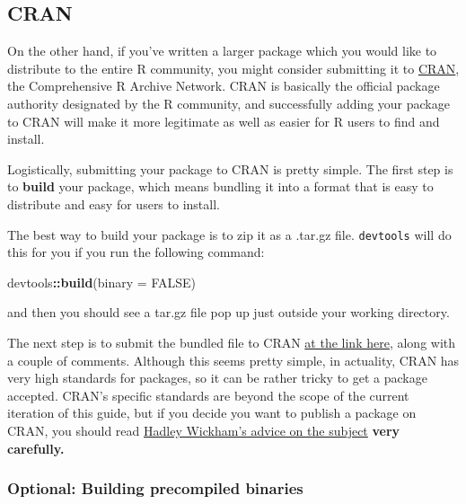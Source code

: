 \documentclass[]{book}
\newenvironment{Shaded}{\begin{snugshade}}{\end{snugshade}}
\newcommand{\KeywordTok}[1]{\textcolor[rgb]{0.13,0.29,0.53}{\textbf{#1}}}
\newcommand{\DataTypeTok}[1]{\textcolor[rgb]{0.13,0.29,0.53}{#1}}
\newcommand{\OtherTok}[1]{\textcolor[rgb]{0.56,0.35,0.01}{#1}}
\newcommand{\OperatorTok}[1]{\textcolor[rgb]{0.81,0.36,0.00}{\textbf{#1}}}
\newcommand{\NormalTok}[1]{#1}
\begin{document}
\subsection{CRAN}\label{cran}

On the other hand, if you've written a larger package which you would
like to distribute to the entire R community, you might consider
submitting it to \href{https://cran.r-project.org/}{CRAN}, the
Comprehensive R Archive Network. CRAN is basically the official package
authority designated by the R community, and successfully adding your
package to CRAN will make it more legitimate as well as easier for R
users to find and install.

Logistically, submitting your package to CRAN is pretty simple. The
first step is to \textbf{build} your package, which means bundling it
into a format that is easy to distribute and easy for users to install.

The best way to build your package is to zip it as a .tar.gz file.
\texttt{devtools} will do this for you if you run the following command:

\begin{Shaded}
\begin{Highlighting}[]
\NormalTok{devtools}\OperatorTok{::}\KeywordTok{build}\NormalTok{(}\DataTypeTok{binary =} \OtherTok{FALSE}\NormalTok{)}
\end{Highlighting}
\end{Shaded}

and then you should see a tar.gz file pop up just outside your working
directory.

The next step is to submit the bundled file to CRAN
\href{https://cran.r-project.org/submit.html}{at the link here}, along
with a couple of comments. Although this seems pretty simple, in
actuality, CRAN has very high standards for packages, so it can be
rather tricky to get a package accepted. CRAN's specific standards are
beyond the scope of the current iteration of this guide, but if you
decide you want to publish a package on CRAN, you should read
\href{http://r-pkgs.had.co.nz/release.html}{Hadley Wickham's advice on
the subject} \textbf{very carefully.}

\subsubsection{Optional: Building precompiled
binaries}\label{optional-building-precompiled-binaries}
\end{document}
